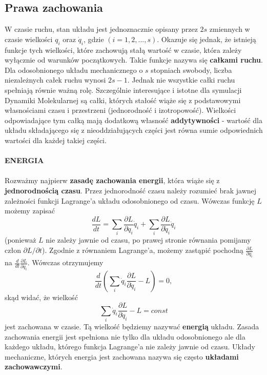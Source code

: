 \documentclass[12pt,a4paper,openright]{report} %
\begin{document}
\subsection{Prawa zachowania}
W czasie ruchu, stan układu jest jednoznacznie opisany przez $2s$ zmiennych w czasie wielkości $q_i$ oraz $\dot{q}_i$, gdzie $(i=1,2,...,s)$. Okazuje się jednak, że istnieją funkcje tych wielkości, które zachowują stałą wartość w czasie, która zależy wyłącznie od warunków początkowych. Takie funkcje nazywa się \textbf{całkami ruchu}. Dla odosobnionego układu mechanicznego o $s$ stopniach swobody, liczba niezależnych całek ruchu wynosi $2s-1$. Jednak nie wszystkie całki ruchu spełniają równie ważną rolę. Szczególnie interesujące i istotne dla symulacji Dynamiki Molekularnej są całki, których stałość wiąże się z podstawowymi własnościami czasu i przestrzeni (jednorodność i izotropowość). Wielkości odpowiadające tym całką mają dodatkową własność \textbf{addytywności} - wartość dla układu składającego się z nieoddziałujących części jest równa sumie odpowiednich wartości dla każdej takiej części. 
\\
\\
\textbf{ENERGIA}\\
\\
Rozważmy najpierw \textbf{zasadę zachowania energii}, która wiąże się z \textbf{jednorodnością czasu}. Przez jednorodność czasu należy rozumieć brak jawnej zależności funkcji Lagrange'a układu odosobnionego od czasu. Wówczas funkcję $L$ możemy zapisać
\begin{equation}
\frac{dL}{dt}=\sum \limits_{i} \frac{\partial L}{\partial q_i} \dot{q}_i+\sum \limits_{i} \frac{\partial L}{\partial \dot{q}_i}\ddot{q}_i
\end{equation}  
(ponieważ $L$ nie zależy jawnie od czasu, po prawej stronie równania pomijamy człon $\partial L / \partial t$). %
Zgodnie z równaniem Lagrange'a, możemy zastąpić pochodną $\frac{\partial L}{\partial q_i}$ na $\frac{d}{dt} \frac{\partial L}{\partial \dot{q}_i}$. Wówczas otrzymujemy
\begin{equation}
\frac{d}{dt}\left( \sum \limits_{i} \dot{q}_i \frac{\partial L}{\partial \dot{q}_i} -L \right) =0,
\end{equation}
skąd widać, że wielkość
\begin{equation}
\sum \limits_{i} \dot{q}_i \frac{\partial L}{\partial \dot{q}_i} -L=const
\end{equation}
jest zachowana w czasie. Tą wielkość będziemy nazywać \textbf{energią} układu. Zasada zachowania energii jest spełniona nie tylko dla układu odosobnionego ale dla każdego układu, którego funkcja Lagrange'a nie zależy jawnie od czasu. Układy mechaniczne, których energia jest zachowana nazywa się często \textbf{układami zachowawczymi}.
\end{document}
